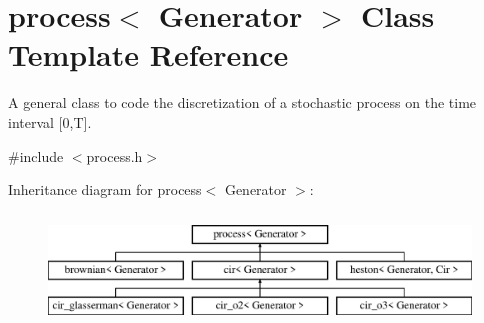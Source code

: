 \hypertarget{classprocess}{}\section{process$<$ Generator $>$ Class Template Reference}
\label{classprocess}


A general class to code the discretization of a stochastic process on the time interval \mbox{[}0,T\mbox{]}.  




{\ttfamily \#include $<$process.\+h$>$}

Inheritance diagram for process$<$ Generator $>$\+:\begin{figure}[H]
\begin{center}
\leavevmode
\includegraphics[height=2.994653cm]{classprocess}
\end{center}
\end{figure}
